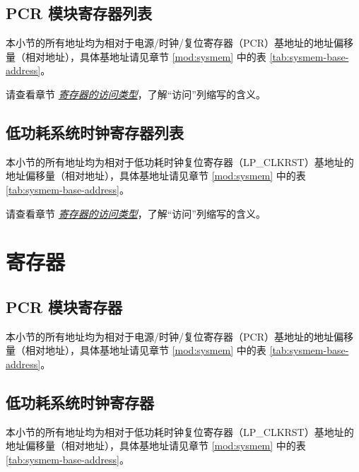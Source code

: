 \documentclass[main\_\_CN.tex]{subfiles}
\begin{document}
\subsection{PCR 模块寄存器列表}


本小节的所有地址均为相对于电源/时钟/复位寄存器（PCR）基地址的地址偏移量（相对地址），具体基地址请见章节 \ref{mod:sysmem} \textit{} 中的表 \ref{tab:sysmem-base-address}。

请查看章节 \hyperref[glossary-access-types]{\textit{寄存器的访问类型}}，了解“访问”列缩写的含义。



\subsection{低功耗系统时钟寄存器列表}


本小节的所有地址均为相对于低功耗时钟复位寄存器（LP\_CLKRST）基地址的地址偏移量（相对地址），具体基地址请见章节 \ref{mod:sysmem} \textit{} 中的表 \ref{tab:sysmem-base-address}。

请查看章节 \hyperref[glossary-access-types]{\textit{寄存器的访问类型}}，了解“访问”列缩写的含义。









\section{寄存器}


\subsection{PCR 模块寄存器}


本小节的所有地址均为相对于电源/时钟/复位寄存器（PCR）基地址的地址偏移量（相对地址），具体基地址请见章节 \ref{mod:sysmem} \textit{} 中的表 \ref{tab:sysmem-base-address}。





\subsection{低功耗系统时钟寄存器}


本小节的所有地址均为相对于低功耗时钟复位寄存器（LP\_CLKRST）基地址的地址偏移量（相对地址），具体基地址请见章节 \ref{mod:sysmem} \textit{} 中的表 \ref{tab:sysmem-base-address}。



\end{document}
